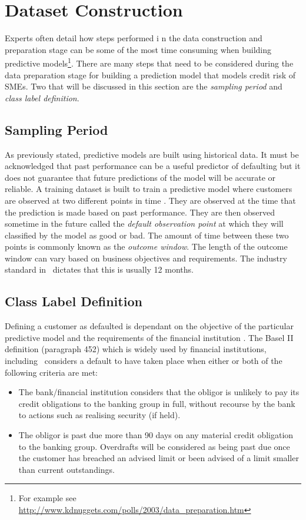 \section{Dataset Construction}\label{sec:datasetConstruction}

Experts often detail how steps performed i n the data construction and preparation stage can be some of the most time consuming when building predictive models\footnote{For example see \url{http://www.kdnuggets.com/polls/2003/data_preparation.htm}}. There are many steps that need to be considered during the data preparation stage for building a prediction model that models credit risk of SMEs. Two that will be discussed in this section are the \textit{sampling period} and \textit{class label definition}. 

\subsection{Sampling Period}
As previously stated, predictive models are built using historical data. It must be acknowledged that past performance can be a useful predictor of defaulting but it does not guarantee that future predictions of the model will be accurate or reliable. A training dataset is built to train a predictive model where customers are observed at two different points in time \citep{martens_credit_2010}. They are observed at the time that the prediction is made based on past performance. They are then observed sometime in the future called the \textit{default observation point} at which they will classified by the model as good or bad. The amount of time between these two points is commonly known as the \textit{outcome window}. The length of the outcome window can vary based on business objectives and requirements. The industry standard in \subjectname\ dictates that this is usually 12 months. 

\subsection{Class Label Definition} \label{classLabelDef}
Defining a customer as defaulted is dependant on the objective of the particular predictive model and the requirements of the financial institution \citep{mcnab_principles_2000}. The Basel II definition (paragraph 452) which is widely used by financial institutions, including \subjectname\, considers a default to have taken place when either or both of the following criteria are met:
\vspace{-3mm} 
\begin{itemize}
	\item The bank/financial institution considers that the obligor is unlikely to pay its credit obligations to the banking group in full, without recourse by the bank to actions such as realising security (if held).
	\item The obligor is past due more than 90 days on any material credit obligation to the banking group. Overdrafts will be considered as being past due once the customer has breached an advised limit or been advised of a limit smaller than current outstandings.
\end{itemize} 

